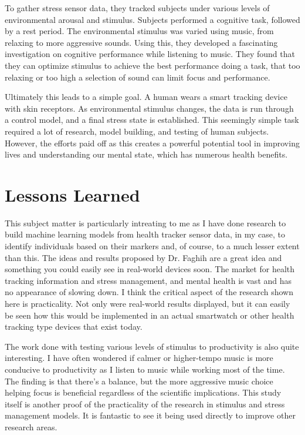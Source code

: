 \documentclass[journal,onecolumn]{IEEEtran}
\begin{document}
To gather stress sensor data, they tracked subjects under various levels of environmental arousal and stimulus. Subjects performed a cognitive task, followed by a rest period. The environmental stimulus was varied using music, from relaxing to more aggressive sounds. Using this, they developed a fascinating investigation on cognitive performance while listening to music. They found that they can optimize stimulus to achieve the best performance doing a task, that too relaxing or too high a selection of sound can limit focus and performance. 

Ultimately this leads to a simple goal. A human wears a smart tracking device with skin receptors. As environmental stimulus changes, the data is run through a control model, and a final stress state is established. This seemingly simple task required a lot of research, model building, and testing of human subjects. However, the efforts paid off as this creates a powerful potential tool in improving lives and understanding our mental state, which has numerous health benefits. 

\section{Lessons Learned}

This subject matter is particularly intreating to me as I have done research to build machine learning models from health tracker sensor data, in my case, to identify individuals based on their markers and, of course, to a much lesser extent than this. The ideas and results proposed by Dr. Faghih are a great idea and something you could easily see in real-world devices soon. The market for health tracking information and stress management, and mental health is vast and has no appearance of slowing down. I think the critical aspect of the research shown here is practicality. Not only were real-world results displayed, but it can easily be seen how this would be implemented in an actual smartwatch or other health tracking type devices that exist today. 

The work done with testing various levels of stimulus to productivity is also quite interesting. I have often wondered if calmer or higher-tempo music is more conducive to productivity as I listen to music while working most of the time. The finding is that there's a balance, but the more aggressive music choice helping focus is beneficial regardless of the scientific implications. This study itself is another proof of the practicality of the research in stimulus and stress management models. It is fantastic to see it being used directly to improve other research areas. 
\end{document}

